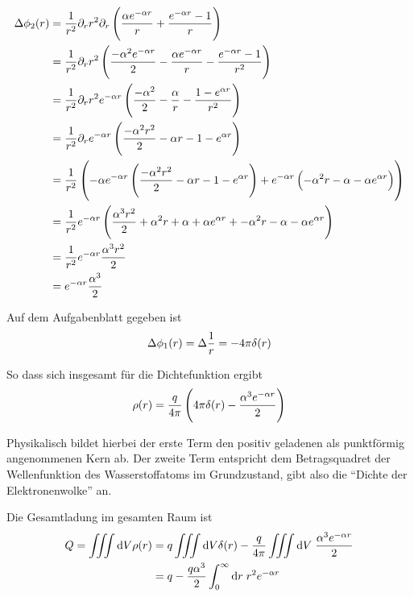 \documentclass[a4paper,german,12pt,smallheadings]{scrartcl}
\begin{document}
\begin{align}
  \laplace \phi_2(r) &= \frac{1}{r^2} \partial_r r^2 \partial_r \del{\frac{\alpha e^{-\alpha r}}{r} + \frac{e^{-\alpha r} - 1}{r}} \\
                     &= \frac{1}{r^2} \partial_r r^2 \del{ \frac{-\alpha^2 e^{-\alpha r}}{2} - \frac{\alpha e^{-\alpha r}}{r} - \frac{e^{-\alpha r} - 1}{r^2}} \\
                     &= \frac{1}{r^2} \partial_r r^2 e^{-\alpha r} \del{ \frac{-\alpha^2}{2} - \frac{\alpha}{r} - \frac{1 - e^{\alpha r}}{r^2}} \\
                     &= \frac{1}{r^2} \partial_r e^{-\alpha r} \del{ \frac{-\alpha^2r^2}{2} - \alpha r - 1 - e^{\alpha r}} \\
                     &= \frac{1}{r^2} \del{
                        -\alpha e^{-\alpha r} \del{ \frac{-\alpha^2r^2}{2} - \alpha r - 1 - e^{\alpha r}} +
                        e^{-\alpha r} \del{ -\alpha^2 r - \alpha - \alpha e^{\alpha r}}
                      } \\
                      &= \frac{1}{r^2} e^{-\alpha r} \del{
                        \frac{\alpha^3r^2}{2} + \alpha^2 r + \alpha + \alpha e^{\alpha r} +
                         -\alpha^2 r - \alpha - \alpha e^{\alpha r}
                      } \\
                      &= \frac{1}{r^2} e^{-\alpha r} \frac{\alpha^3r^2}{2} \\
                      &= e^{-\alpha r} \frac{\alpha^3}{2}
\end{align}

Auf dem Aufgabenblatt gegeben ist
\begin{equation}
  \mathop{}\!\mathbin\Delta \phi_1(r) = \mathop{}\!\mathbin\Delta \frac{1}{r} = - 4 \pi \delta(r)
\end{equation}

So dass sich insgesamt für die Dichtefunktion ergibt
\begin{equation}
  \rho(r) = \frac{q}{4 \pi} \del{4 \pi \delta(r) - \frac{\alpha^3 e^{-\alpha r}}{2}}
\end{equation}

Physikalisch bildet hierbei der erste Term den positiv geladenen als
punktförmig angenommenen Kern ab. Der zweite Term entspricht dem Betragsquadret
der Wellenfunktion des Wasserstoffatoms im Grundzustand, gibt also die ``Dichte
der Elektronenwolke'' an.

Die Gesamtladung im gesamten Raum ist
\begin{align}
  Q = \iiint \dif V \rho(r) &= q \iiint \dif V \delta(r) - \frac{q}{4 \pi} \iiint \dif V \; \frac{\alpha^3 e^{-\alpha r}}{2} \\
                            &= q - \frac{q \alpha^3}{2} \int_0^\infty \dif r \; r^2 e^{-\alpha r}
\end{align}
\end{document}
